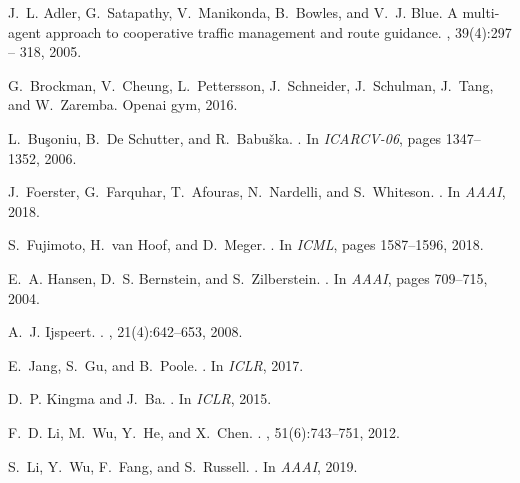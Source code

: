 \documentclass{article}
\begin{document}
\begin{thebibliography}{10}
	
	J.~L. Adler, G.~Satapathy, V.~Manikonda, B.~Bowles, and V.~J. Blue.
	\newblock A multi-agent approach to cooperative traffic management and route
	guidance.
	, 39(4):297 --
	318, 2005.
	
	G.~Brockman, V.~Cheung, L.~Pettersson, J.~Schneider, J.~Schulman, J.~Tang, and
	W.~Zaremba.
	\newblock Openai gym, 2016.
	
	L.~Buşoniu, B.~{De Schutter}, and R.~Babu{\v{s}}ka.
	.
	\newblock In {\em ICARCV-06}, pages 1347--1352, 2006.
	
	J.~Foerster, G.~Farquhar, T.~Afouras, N.~Nardelli, and S.~Whiteson.
	.
	\newblock In {\em AAAI}, 2018.
	
	S.~Fujimoto, H.~van Hoof, and D.~Meger.
	.
	\newblock In {\em ICML}, pages 1587--1596, 2018.
	
	E.~A. Hansen, D.~S. Bernstein, and S.~Zilberstein.
	.
	\newblock In {\em AAAI}, pages 709--715, 2004.
	
	A.~J. Ijspeert.
	.
	, 21(4):642--653, 2008.
	
	E.~Jang, S.~Gu, and B.~Poole.
	.
	\newblock In {\em ICLR}, 2017.
	
	D.~P. Kingma and J.~Ba.
	.
	\newblock In {\em ICLR}, 2015.
	
	F.~D. Li, M.~Wu, Y.~He, and X.~Chen.
	.
	, 51(6):743--751, 2012.
	
	S.~Li, Y.~Wu, F.~Fang, and S.~Russell.
	.
	\newblock In {\em AAAI}, 2019.
	

\end{thebibliography}
\end{document}
